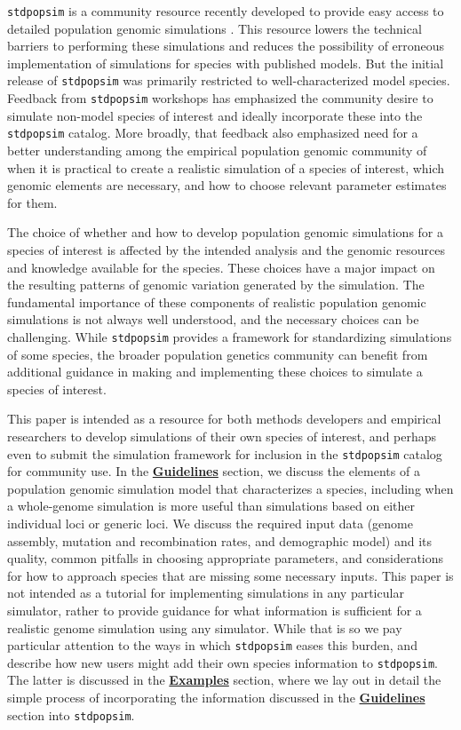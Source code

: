 \documentclass[hidelinks]{article}
\newcommand{\stdpopsim}{\texttt{stdpopsim}\xspace}
\begin{document}
\stdpopsim is a community resource recently developed to provide easy
access to detailed population genomic simulations \citep{Adrion2020}. This
resource lowers the technical barriers to performing these simulations
and reduces the possibility of erroneous implementation of simulations
for species with published models. But the initial release of \stdpopsim was
primarily restricted to well-characterized model species. Feedback from
\stdpopsim workshops has emphasized the community desire to simulate
non-model species of interest and ideally incorporate these into the \stdpopsim catalog.
More broadly, that feedback also emphasized need for a better understanding among the empirical population
genomic community of when it is practical to create a realistic
simulation of a species of interest, which genomic elements are
necessary, and how to choose relevant parameter estimates for them.

The choice of whether and how to develop population genomic
simulations for a species of interest is affected by the intended
analysis and the genomic resources and knowledge available for the
species. These choices have a major impact on the resulting patterns of
genomic variation generated by the simulation. The fundamental
importance of these components of realistic population genomic
simulations is not always well understood, and the necessary choices can
be challenging. While \stdpopsim provides a framework for standardizing
simulations of some species, the broader population genetics community
can benefit from additional guidance in making and implementing these
choices to simulate a species of interest.

This paper is intended as a resource for both methods
developers and empirical researchers to develop simulations of their own
species of interest, and perhaps even to submit the simulation
framework for inclusion in the \stdpopsim catalog for community use.
In the \hyperref[sec:sim-guidelines]{\textbf{Guidelines}} section,
we discuss the elements of a
population genomic simulation model that characterizes a
species, including when a whole-genome simulation is more useful than
simulations based on either individual loci or generic loci.
We discuss the required input data (genome assembly,
mutation and recombination rates, and demographic model) and
its quality, common pitfalls in choosing appropriate parameters, and
considerations for how to approach species that are missing some
necessary inputs. This paper is not intended as a tutorial for
implementing simulations in any particular simulator, rather to provide
guidance for what information is sufficient for a realistic genome simulation
using any simulator. While that is so we pay particular attention to the ways
in which \stdpopsim eases this burden, and describe how new users might
add their own species information to \stdpopsim.
The latter is discussed in the \hyperref[sec:examples]{\textbf{Examples}} section, where we lay out in
detail the simple process of incorporating the information discussed
in the \hyperref[sec:sim-guidelines]{\textbf{Guidelines}} section into \stdpopsim.
\end{document}
